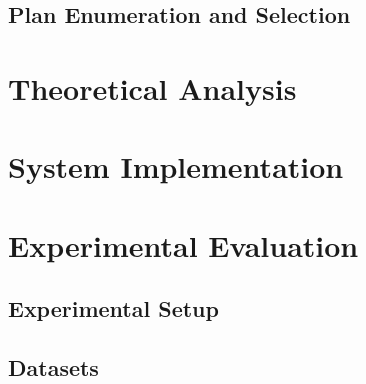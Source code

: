 \documentclass[conference]{IEEEtran}
\begin{document}
\subsection{Plan Enumeration and Selection}

\section{Theoretical Analysis}

\section{System Implementation}

\section{Experimental Evaluation}
\subsection{Experimental Setup}

\subsection{Datasets}
\end{document}
